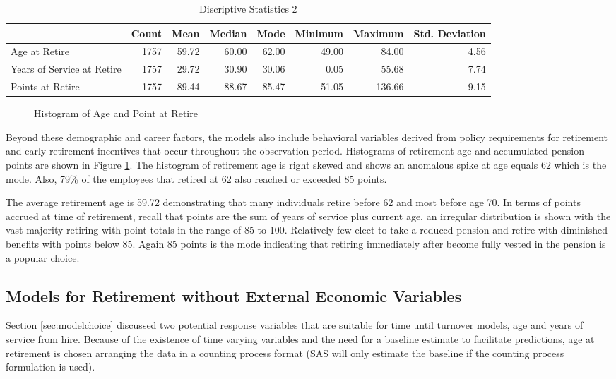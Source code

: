 \begin{table}[htbp]
	\centering
	\scriptsize
	\caption{Discriptive Statistics 2}
	\begin{tabular}{lrrrrrrr}
		\toprule
		& Count & Mean  & Median & Mode  & Minimum & Maximum & Std. Deviation \\
		\midrule
		\multicolumn{1}{l}{Age at Retire} & 1757  & 59.72 & 60.00 & 62.00 & 49.00 & 84.00 & 4.56 \\
		\multicolumn{1}{l}{Years of Service at Retire} & 1757  & 29.72 & 30.90 & 30.06 & 0.05  & 55.68 & 7.74 \\
		\multicolumn{1}{l}{Points at Retire} & 1757  & 89.44 & 88.67 & 85.47 & 51.05 & 136.66 & 9.15 \\
		\bottomrule
	\end{tabular}%
	\label{tab:descrip2}%
\end{table}%

\begin{figure}[h!]
	\centering
	\caption{Histogram of Age and Point at Retire}
	\label{fig:hist}
\end{figure}

Beyond these demographic and career factors, the models also include behavioral variables derived from policy requirements for retirement and early retirement incentives that occur throughout the observation period. Histograms of retirement age and accumulated pension points are shown in Figure \ref{fig:hist}. The histogram of retirement age is right skewed and shows an anomalous spike at age equals 62 which is the mode. Also, 79\% of the employees that retired at 62 also reached or exceeded 85 points.

The average retirement age is 59.72 demonstrating that many individuals retire before 62 and most before age 70. In terms of points accrued at time of retirement, recall that points are the sum of years of service plus current age, an irregular distribution is shown with the vast majority retiring with point totals in the range of 85 to 100. Relatively few elect to take a reduced pension and retire with diminished benefits with points below 85. Again 85 points is the mode indicating that retiring immediately after become fully vested in the pension is a popular choice.

\subsection{Models for Retirement without External Economic Variables}
Section \ref{sec:modelchoice} discussed two potential response variables that are suitable for time until turnover models, age and years of service from hire.  Because of the existence of time varying variables and the need for a baseline estimate to facilitate predictions, age at retirement is chosen arranging the data in a counting process format (SAS will only estimate the baseline if the counting process formulation is used).

